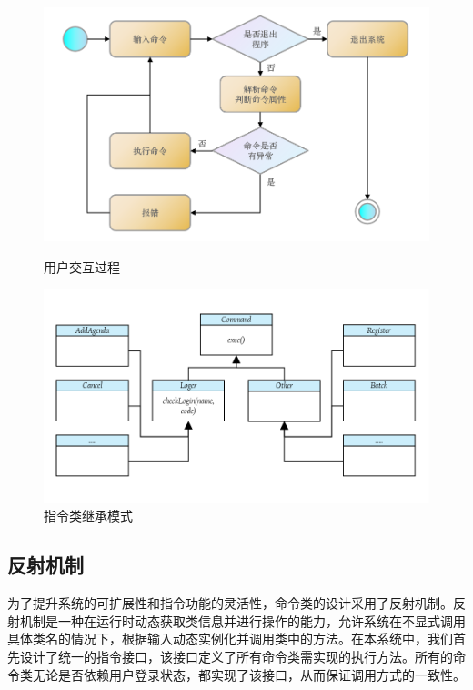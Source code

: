 \documentclass[a4paper, twoside, utf8]{ctexart}
\begin{document}
    \begin{figure}[htbp]
        \centering
        \begin{minipage}{.45\textwidth}
            \centering
            \includegraphics[width=.9\linewidth]{figure/process.png}
            \caption{用户交互过程}
        \end{minipage}
        \begin{minipage}{.45\textwidth}
            \centering
            \includegraphics[width=.9\linewidth]{figure/command.png}
            \caption{指令类继承模式}
        \end{minipage}
    \end{figure}

    \subsection{反射机制}

    为了提升系统的可扩展性和指令功能的灵活性，命令类的设计采用了反射机制。反射机制是一种在运行时动态获取类信息并进行操作的能力，允许系统在不显式调用具体类名的情况下，根据输入动态实例化并调用类中的方法。在本系统中，我们首先设计了统一的指令接口，该接口定义了所有命令类需实现的执行方法。所有的命令类无论是否依赖用户登录状态，都实现了该接口，从而保证调用方式的一致性。
\end{document}
